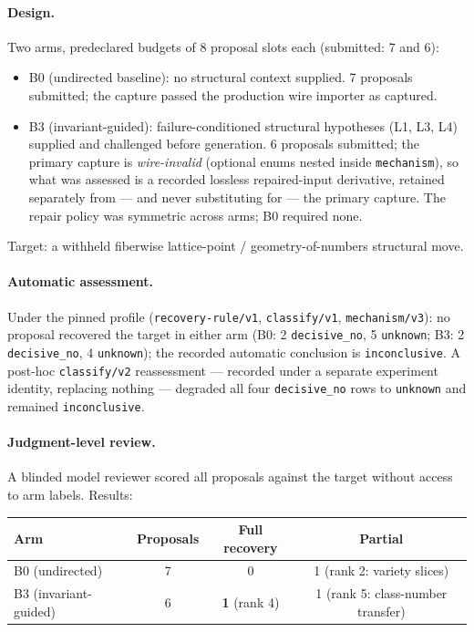 \documentclass[11pt]{article}
\theoremstyle{gowthm}
\theoremstyle{gowplain}
\begin{document}
\paragraph{Design.}
Two arms, predeclared budgets of 8 proposal slots each (submitted: 7 and 6):
\begin{itemize}[nosep]
  \item B0 (undirected baseline): no structural context supplied. 7 proposals
    submitted; the capture passed the production wire importer as captured.
  \item B3 (invariant-guided): failure-conditioned structural hypotheses
    (L1, L3, L4) supplied and challenged before generation. 6 proposals
    submitted; the primary capture is \emph{wire-invalid} (optional enums
    nested inside \texttt{mechanism}), so what was assessed is a recorded
    lossless repaired-input derivative, retained separately from --- and never
    substituting for --- the primary capture. The repair policy was symmetric
    across arms; B0 required none.
\end{itemize}
Target: a withheld fiberwise lattice-point / geometry-of-numbers structural move.

\paragraph{Automatic assessment.}
Under the pinned profile (\texttt{recovery-rule/v1}, \texttt{classify/v1},
\texttt{mechanism/v3}): no proposal recovered the target in either arm
(B0: 2 \texttt{decisive\_no}, 5 \texttt{unknown}; B3: 2 \texttt{decisive\_no},
4 \texttt{unknown}); the recorded automatic conclusion is
\texttt{inconclusive}. A post-hoc \texttt{classify/v2} reassessment ---
recorded under a separate experiment identity, replacing nothing --- degraded
all four \texttt{decisive\_no} rows to \texttt{unknown} and remained
\texttt{inconclusive}.

\paragraph{Judgment-level review.}
A blinded model reviewer scored all proposals against the target without access
to arm labels. Results:
\begin{center}
\begin{tabular}{lccc}
\toprule
Arm & Proposals & Full recovery & Partial \\
\midrule
B0 (undirected) & 7 & 0 & 1 (rank 2: variety slices) \\
B3 (invariant-guided) & 6 & \textbf{1} (rank 4) & 1 (rank 5: class-number transfer) \\
\bottomrule
\end{tabular}
\end{center}
\end{document}
